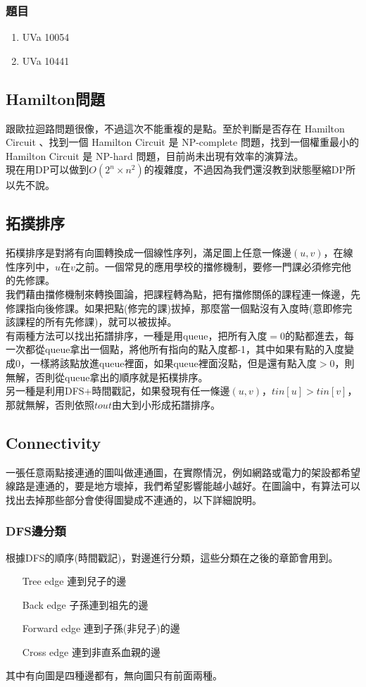 \subsubsection{題目}
\begin{enumerate}
\item UVa 10054
\item UVa 10441
\end{enumerate}
\subsection{Hamilton問題}
跟歐拉迴路問題很像，不過這次不能重複的是點。至於判斷是否存在 Hamilton Circuit 、找到一個 Hamilton Circuit 是 NP-complete 問題，找到一個權重最小的 Hamilton Circuit 是 NP-hard 問題，目前尚未出現有效率的演算法。\\
現在用DP可以做到$O(2^n\times n^2)$的複雜度，不過因為我們還沒教到狀態壓縮DP所以先不說。
\subsection{拓撲排序}
拓樸排序是對將有向圖轉換成一個線性序列，滿足圖上任意一條邊$(u,v)$，在線性序列中，$u$在$v$之前。一個常見的應用學校的擋修機制，要修一門課必須修完他的先修課。\\
我們藉由擋修機制來轉換圖論，把課程轉為點，把有擋修關係的課程連一條邊，先修課指向後修課。如果把點(修完的課)拔掉，那麼當一個點沒有入度時(意即修完該課程的所有先修課)，就可以被拔掉。\\
有兩種方法可以找出拓譜排序，一種是用queue，把所有入度$=0$的點都進去，每一次都從queue拿出一個點，將他所有指向的點入度都-1，其中如果有點的入度變成0，一樣將該點放進queue裡面，如果queue裡面沒點，但是還有點入度$>0$，則無解，否則從queue拿出的順序就是拓樸排序。\\
另一種是利用DFS+時間戳記，如果發現有任一條邊$(u,v)$，$tin[u]>tin[v]$，那就無解，否則依照$tout$由大到小形成拓譜排序。
\subsection{Connectivity}
一張任意兩點接連通的圖叫做連通圖，在實際情況，例如網路或電力的架設都希望線路是連通的，要是地方壞掉，我們希望影響能越小越好。在圖論中，有算法可以找出去掉那些部分會使得圖變成不連通的，以下詳細說明。
\subsubsection{DFS邊分類}
根據DFS的順序(時間戳記)，對邊進行分類，這些分類在之後的章節會用到。
\begin{enumerate}
\item [Tree edge] 連到兒子的邊
\item [Back edge] 子孫連到祖先的邊
\item [Forward edge] 連到子孫(非兒子)的邊
\item [Cross edge] 連到非直系血親的邊
\end{enumerate}
其中有向圖是四種邊都有，無向圖只有前面兩種。
